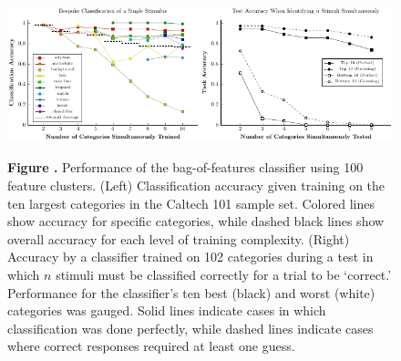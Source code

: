 \documentclass{frontiersSCNS} %
\begin{document}
\begin{figure}[h]
\begin{center}
\includegraphics[width=17cm]{Figure-01.pdf}%
\end{center}
 \textbf{\label{fig:01} Figure .}{ Performance of the bag-of-features classifier using 100 feature clusters. (Left) Classification accuracy given training on the ten largest categories in the Caltech 101 sample set. Colored lines show accuracy for specific categories, while dashed black lines show overall accuracy for each level of training complexity. (Right) Accuracy by a classifier trained on 102 categories during a test in which $n$ stimuli must be classified correctly for a trial to be `correct.' Performance for the classifier's ten best (black) and worst (white) categories was gauged. Solid lines indicate cases in which classification was done perfectly, while dashed lines indicate cases where correct responses required at least one guess.}
\end{figure}


\end{document}
